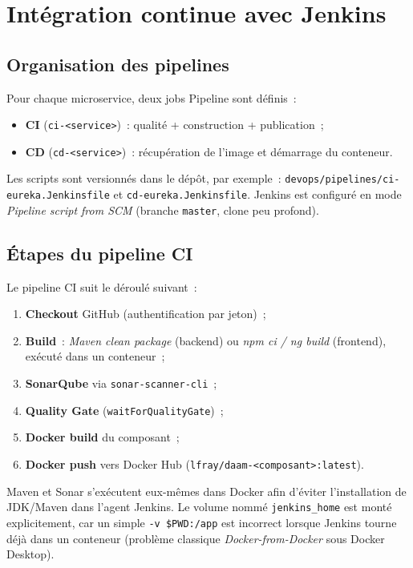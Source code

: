 \section{Intégration continue avec Jenkins}

\subsection{Organisation des pipelines}

Pour chaque microservice, deux jobs Pipeline sont définis~:
\begin{itemize}
  \item \textbf{CI} (\texttt{ci-<service>})~: qualité + construction +
        publication~;
  \item \textbf{CD} (\texttt{cd-<service>})~: récupération de l'image et
        démarrage du conteneur.
\end{itemize}

Les scripts sont versionnés dans le dépôt, par exemple~:
\texttt{devops/pipelines/ci-eureka.Jenkinsfile} et
\texttt{cd-eureka.Jenkinsfile}. Jenkins est configuré en mode
\emph{Pipeline script from SCM} (branche \texttt{master}, clone peu
profond).

\subsection{Étapes du pipeline CI}

Le pipeline CI suit le déroulé suivant~:
\begin{enumerate}
  \item \textbf{Checkout} GitHub (authentification par jeton)~;
  \item \textbf{Build}~: \emph{Maven clean package} (backend) ou
        \emph{npm ci / ng build} (frontend), exécuté dans un conteneur~;
  \item \textbf{SonarQube} via \texttt{sonar-scanner-cli}~;
  \item \textbf{Quality Gate} (\texttt{waitForQualityGate})~;
  \item \textbf{Docker build} du composant~;
  \item \textbf{Docker push} vers Docker Hub
        (\texttt{lfray/daam-<composant>:latest}).
\end{enumerate}

Maven et Sonar s'exécutent eux-mêmes dans Docker afin d'éviter
l'installation de JDK/Maven dans l'agent Jenkins. Le volume nommé
\texttt{jenkins\_home} est monté explicitement, car un simple
\texttt{-v \$PWD:/app} est incorrect lorsque Jenkins tourne déjà dans un
conteneur (problème classique \emph{Docker-from-Docker} sous Docker
Desktop).

